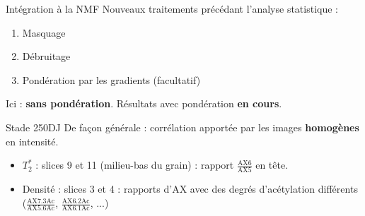 \documentclass[10pt]{beamer}
\begin{document}
\begin{frame}{Intégration à la NMF}
  Nouveaux traitements précédant l'analyse statistique :
  \begin{enumerate}
  \item Masquage
  \item Débruitage
  \item Pondération par les gradients (facultatif)
  \end{enumerate}

  Ici : \textbf{sans pondération}. Résultats avec pondération \textbf{en cours}.
\end{frame}


\begin{frame}{Stade 250DJ}
  De façon générale : corrélation apportée par les images \textbf{homogènes} en intensité.

  \begin{itemize}
  \item  $T_2^*$ : slices 9 et 11 (milieu-bas du grain) : rapport $\frac{\text{AX6}}{\text{AX5}}$ en tête.
  \item   Densité : slices 3 et 4 : rapports d'AX avec des degrés d'acétylation différents ($\frac{\text{AX7.3Ac}}{\text{AX5.6Ac}}$, $\frac{\text{AX6.2Ac}}{\text{AX6.1Ac}}$, ...)
  \end{itemize}



\end{frame}
\end{document}
